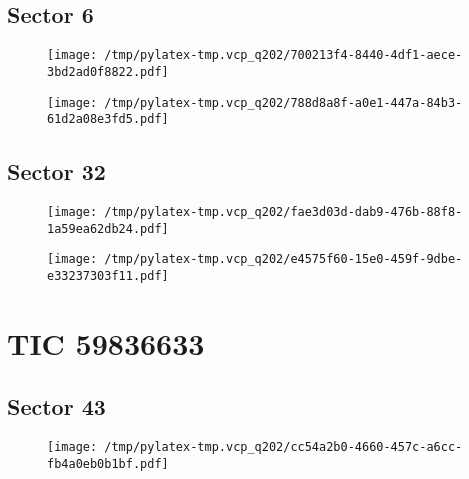 \documentclass{report}%
\begin{document}
\subsection{Sector 6}%
\label{subsec:507455676}%


\begin{figure}[H]%
\begin{center}%
\centering%
\texttt{[image: /tmp/pylatex-tmp.vcp\_q202/700213f4-8440-4df1-aece-3bd2ad0f8822.pdf]}%
\end{center}%
\end{figure}

%


\begin{figure}[H]%
\begin{center}%
\centering%
\texttt{[image: /tmp/pylatex-tmp.vcp\_q202/788d8a8f-a0e1-447a-84b3-61d2a08e3fd5.pdf]}%
\end{center}%
\end{figure}

%
\subsection{Sector 32}%
\label{subsec:5074556732}%


\begin{figure}[H]%
\begin{center}%
\centering%
\texttt{[image: /tmp/pylatex-tmp.vcp\_q202/fae3d03d-dab9-476b-88f8-1a59ea62db24.pdf]}%
\end{center}%
\end{figure}

%


\begin{figure}[H]%
\begin{center}%
\centering%
\texttt{[image: /tmp/pylatex-tmp.vcp\_q202/e4575f60-15e0-459f-9dbe-e33237303f11.pdf]}%
\end{center}%
\end{figure}

%
\section{TIC 59836633}%
\label{sec:TIC59836633}%
\subsection{Sector 43}%
\label{subsec:5983663343}%


\begin{figure}[H]%
\begin{center}%
\centering%
\texttt{[image: /tmp/pylatex-tmp.vcp\_q202/cc54a2b0-4660-457c-a6cc-fb4a0eb0b1bf.pdf]}%
\end{center}%
\end{figure}
\end{document}
